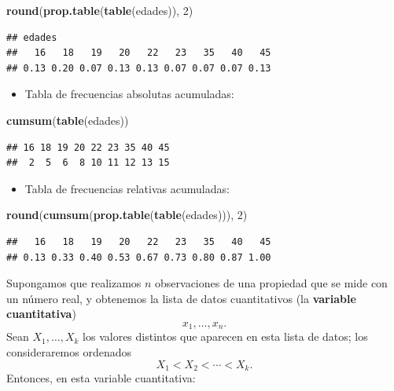 \documentclass[]{book}
\newenvironment{Shaded}{\begin{snugshade}}{\end{snugshade}}
\newcommand{\DecValTok}[1]{\textcolor[rgb]{0.00,0.00,0.81}{#1}}
\newcommand{\KeywordTok}[1]{\textcolor[rgb]{0.13,0.29,0.53}{\textbf{#1}}}
\newcommand{\NormalTok}[1]{#1}
\providecommand{\tightlist}{%
  \setlength{\itemsep}{0pt}\setlength{\parskip}{0pt}}
\theoremstyle{definition}
\theoremstyle{definition}
\theoremstyle{definition}
\theoremstyle{remark}
\begin{document}
\begin{Shaded}
\begin{Highlighting}[]
\KeywordTok{round}\NormalTok{(}\KeywordTok{prop.table}\NormalTok{(}\KeywordTok{table}\NormalTok{(edades)), }\DecValTok{2}\NormalTok{) }
\end{Highlighting}
\end{Shaded}

\begin{verbatim}
## edades
##   16   18   19   20   22   23   35   40   45 
## 0.13 0.20 0.07 0.13 0.13 0.07 0.07 0.07 0.13
\end{verbatim}

\begin{itemize}
\tightlist
\item
  Tabla de frecuencias absolutas acumuladas:
\end{itemize}

\begin{Shaded}
\begin{Highlighting}[]
\KeywordTok{cumsum}\NormalTok{(}\KeywordTok{table}\NormalTok{(edades))}
\end{Highlighting}
\end{Shaded}

\begin{verbatim}
## 16 18 19 20 22 23 35 40 45 
##  2  5  6  8 10 11 12 13 15
\end{verbatim}

\begin{itemize}
\tightlist
\item
  Tabla de frecuencias relativas acumuladas:
\end{itemize}

\begin{Shaded}
\begin{Highlighting}[]
\KeywordTok{round}\NormalTok{(}\KeywordTok{cumsum}\NormalTok{(}\KeywordTok{prop.table}\NormalTok{(}\KeywordTok{table}\NormalTok{(edades))), }\DecValTok{2}\NormalTok{)}
\end{Highlighting}
\end{Shaded}

\begin{verbatim}
##   16   18   19   20   22   23   35   40   45 
## 0.13 0.33 0.40 0.53 0.67 0.73 0.80 0.87 1.00
\end{verbatim}

Supongamos que realizamos \(n\) observaciones de una propiedad que se mide con un número real, y obtenemos la lista de datos cuantitativos (la \textbf{variable cuantitativa})
\[
x_1, \ldots, x_n.
\]
Sean \(X_1, \ldots, X_k\) los valores distintos que aparecen en esta lista de datos; los consideraremos ordenados
\[
X_1 < X_2 < \cdots < X_k.
\]
Entonces, en esta variable cuantitativa:
\end{document}
